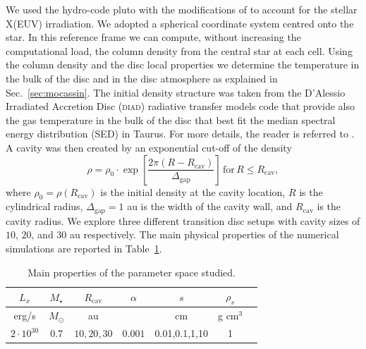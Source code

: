 \documentclass[fleqn,usenatbib]{mnras}
\begin{document}
        We used the hydro-code {\sc pluto} \citep{Mignone2007} with the modifications of \citet{Picogna2019} to account for the stellar X(EUV) irradiation. 
        We adopted a spherical coordinate system centred onto the star.
        In this reference frame we can compute, without increasing the computational load, the column density from the central star at each cell.
        Using the column density and the disc local properties we determine the temperature in the bulk of the disc and in the disc atmosphere as explained in Sec.~\ref{sec:mocassin}.
        The initial density structure was taken from the D’Alessio Irradiated Accretion Disc (\textsc{diad}) radiative transfer models \citep{DAlessio1998,DAlessio1999,DAlessio2001,DAlessio2005,DAlessio2006} code that provide also the gas temperature in the bulk of the disc that best fit the median spectral energy distribution (SED) in Taurus. For more details, the reader is referred to \citet{Picogna2019}. A cavity was then created by an exponential cut-off of the density
        \begin{equation}
          \rho = \rho_0 \cdot \exp{\left[\frac{2\pi(R-R_\textrm{cav})}{\Delta_\textrm{gap}}\right]}\, \textrm{for}\, R \leq R_\textrm{cav},
        \end{equation}
        where $\rho_0 = \rho(R_\mathrm{cav})$ is the initial density at the cavity location, $R$ is the cylindrical radius, $\Delta_\textrm{gap} = 1$ au is the width of the cavity wall, and $R_\textrm{cav}$ is the cavity radius.
        We explore three different transition disc setups with cavity sizes of $10$, $20$, and $30$ au respectively.
        The main physical properties of the numerical simulations are reported in Table~\ref{tab:PlutoPars}.
           
        \begin{table}
        \centering
        \begin{tabular}{c c c c c c c}
         \hline
         $L_x$ & $M_\star$ & $R_\textrm{cav}$ & $\alpha$ & $s$ & $\rho_s$\\ 
         \hline
         erg/s & $M_\odot$ & au & & cm & g cm$^3$\\
         \hline
         $2\cdot 10^{30}$ & $0.7$ & $10, 20, 30$ & $0.001$ & 0.01,0.1,1,10 & 1 \\ 
        \hline
        \end{tabular}
        \caption{\label{tab:PlutoPars} Main properties of the parameter space studied.}
        \end{table}
\end{document}
